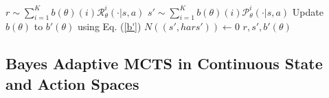 \begin{algorithm}[t]
\begin{multicols}{2}
\begin{algorithmic}
        \State $r \sim \sum_{i=1}^K b(\theta)(i) \mathcal{R}_\theta^i(\cdot|s, a)$
        \State $s' \sim \sum_{i=1}^K b(\theta)(i) \mathcal{P}_\theta^i(\cdot|s, a)$
        \State Update $b(\theta)$ to $b'(\theta)$ using Eq. (\ref{b'})
        \State $N((s', hars')) \leftarrow 0$
        \State \Return $r, s', b'(\theta)$
        \EndIf
      \EndProcedure
    \end{algorithmic}
  \end{multicols}
\end{algorithm}

\subsection{Bayes Adaptive MCTS in Continuous State and Action Spaces} \label{ContBAMCP}




